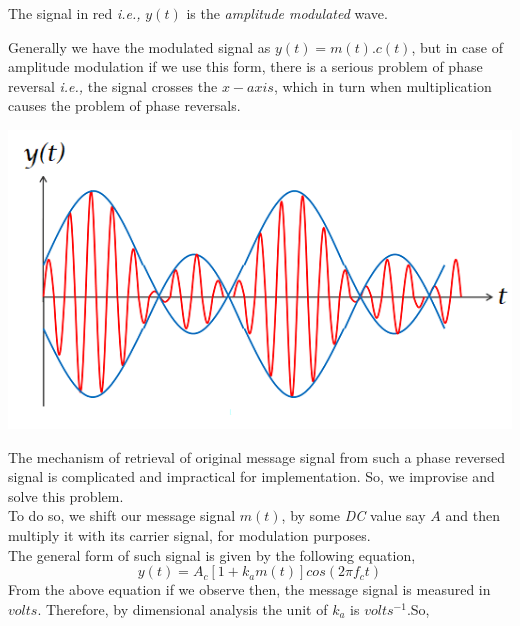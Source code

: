 \documentclass[12pt,a4paper]{article}%
\begin{document}
\begin{flushleft}
\begin{flushleft}
\begin{center}
			\end{center}
			\begin{center}
				The signal in red \textit{i.e.,} $y(t)$ is the \textit{amplitude modulated} wave.
			\end{center}
		Generally we have the modulated signal as $y(t)=m(t).c(t)$, but in case of amplitude modulation if we use this form, there is a serious problem of phase reversal \textit{i.e.,} the signal crosses the $x-axis$, which in turn when multiplication causes the problem of phase reversals.
		\end{flushleft}
		\begin{center}
			\includegraphics[width=0.60 \textwidth]{./SDC-Phase Reversal_1.png}
		\end{center}
		The mechanism of retrieval of original message signal from such a phase reversed signal is complicated and impractical for implementation. So, we improvise and solve this problem.\\\smallskip
		To do so, we shift our message signal $m(t)$, by some \textit{DC} value say $A$ and then multiply it with its carrier signal, for modulation purposes.\\\smallskip
		The general form of such signal is given by the following equation,
		\begin{equation}
			y(t)=A_c [1+k_a m(t)]cos(2 \pi f_c t)
		\end{equation}
		From the above equation if we observe then, the message signal is measured in $volts$. Therefore, by dimensional analysis the unit of $k_a$ is $volts^{-1}$.So,\\\smallskip

\end{flushleft}
\end{document}
